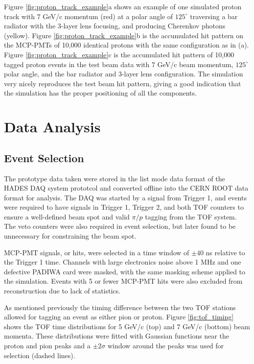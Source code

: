Figure \ref{fig:proton_track_example}a shows an example of one simulated proton track with 7 GeV/c momentum (red) at a polar angle of $125^{\circ}$ traversing a bar radiator with the 3-layer lens focusing, and producing Cherenkov photons (yellow). Figure \ref{fig:proton_track_example}b is the accumulated hit pattern on the MCP-PMTs of 10,000 identical protons with the same configuration as in (a). Figure \ref{fig:proton_track_example}c is the accumulated hit pattern of 10,000 tagged proton events in the test beam data with 7 GeV/c beam momentum, $125^{\circ}$ polar angle, and the bar radiator and 3-layer lens configuration. The simulation very nicely reproduces the test beam hit pattern, giving a good indication that the simulation has the proper positioning of all the components.

\section{Data Analysis}
\subsection{Event Selection}
The prototype data taken were stored in the list mode data format of the HADES DAQ system prototcol \cite{HADES_DAQ} and converted offline into the CERN ROOT data format \cite{ROOT} for analysis. The DAQ was started by a signal from Trigger 1, and events were required to have signals in Trigger 1, Trigger 2, and both TOF counters to ensure a well-defined beam spot and valid $\pi/p$ tagging from the TOF system. The veto counters were also required in event selection, but later found to be unnecessary for constraining the beam spot.

MCP-PMT signals, or hits, were selected in a time window of $\pm 40$ ns relative to the Trigger 1 time. Channels with large electronics noise above 1 MHz and one defective PADIWA card were masked, with the same masking scheme applied to the simulation. Events with 5 or fewer MCP-PMT hits were also excluded from reconstruction due to lack of statistics.

As mentioned previously the timing difference between the two TOF stations allowed for tagging an event as either pion or proton. Figure \ref{fig:tof_timing} shows the TOF time distributions for 5 GeV/c (top) and 7 GeV/c (bottom) beam momenta. These distributions were fitted with Gaussian functions near the proton and pion peaks and a $\pm2\sigma$ window around the peaks was used for selection (dashed lines).

